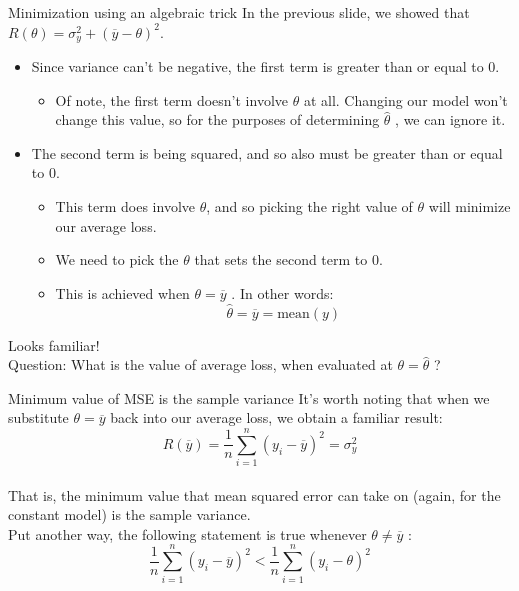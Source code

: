 \documentclass[aspectratio=169]{../latex_main/tntbeamer}  %
\begin{document}
	\begin{frame}{Minimization using an algebraic trick}
	    In the previous slide, we showed that          $R(\theta) = \sigma^2_y + (\overline{y} - \theta )^2$.
	    \begin{itemize}
	        \item Since variance can’t be negative, the first term is greater than or equal to 0.
	        \begin{itemize}
	            \item Of note, the first term doesn’t involve  $\theta$   at all. Changing our model won’t change this value, so for the purposes of determining   $\hat{\theta}$   , we can ignore it.
	        \end{itemize}
	        \item The second term is being squared, and so also must be greater than or equal to 0.
	        \begin{itemize}
	            \item This term does involve    $\theta$, and so picking the right value of $\theta$     will minimize our average loss.
	            \item We need to pick the    $\theta$  that sets the second term to 0.
	            \item This is achieved when      $\theta = \overline{y}$         . In other words: 
                \begin{equation*}
                    \hat{\theta} = \overline{y} = \text{mean}(y)
                \end{equation*}
	        \end{itemize}
	    \end{itemize}
	    Looks familiar!\\
	    Question: What is the value of average loss, when evaluated at       $\theta = \hat{\theta}$        ? 
	\end{frame}
	
	
	\begin{frame}{Minimum value of MSE is the sample variance}
	    It’s worth noting that when we substitute     $\theta = \overline{y}$            back into our average loss, we obtain a familiar result:
	    \begin{equation*}
	        R(\overline{y}) = \frac{1}{n}\sum\limits_{i=1}^n(y_i - \overline{y})^2 = \sigma^2_y
	    \end{equation*}
	    \bigskip\\
	    That is, the minimum value that mean squared error can take on (again, for the constant model) is the sample variance. \\
	    \bigskip
	    Put another way, the following statement is true whenever      $\theta \neq \overline{y}$         : \\
	    \begin{equation*}
	        \frac{1}{n}\sum\limits_{i=1}^n(y_i - \overline{y})^2 < \frac{1}{n}\sum\limits_{i=1}^n(y_i - \theta)^2
	    \end{equation*}
	\end{frame}
	
\end{document}
